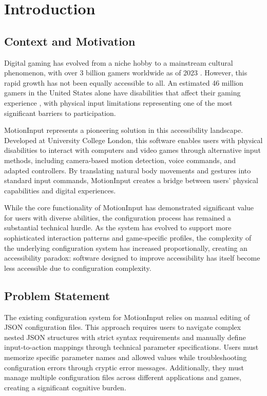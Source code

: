 \chapter{Introduction}

\section{Context and Motivation}
Digital gaming has evolved from a niche hobby to a mainstream cultural phenomenon, with over 3 billion gamers worldwide as of 2023 \cite{newzoo2023}. However, this rapid growth has not been equally accessible to all. An estimated 46 million gamers in the United States alone have disabilities that affect their gaming experience \cite{ablegamers2023}, with physical input limitations representing one of the most significant barriers to participation.

MotionInput represents a pioneering solution in this accessibility landscape. Developed at University College London, this software enables users with physical disabilities to interact with computers and video games through alternative input methods, including camera-based motion detection, voice commands, and adapted controllers. By translating natural body movements and gestures into standard input commands, MotionInput creates a bridge between users' physical capabilities and digital experiences.

While the core functionality of MotionInput has demonstrated significant value for users with diverse abilities, the configuration process has remained a substantial technical hurdle. As the system has evolved to support more sophisticated interaction patterns and game-specific profiles, the complexity of the underlying configuration system has increased proportionally, creating an accessibility paradox: software designed to improve accessibility has itself become less accessible due to configuration complexity.

\section{Problem Statement}
The existing configuration system for MotionInput relies on manual editing of JSON configuration files. This approach requires users to navigate complex nested JSON structures with strict syntax requirements and manually define input-to-action mappings through technical parameter specifications. Users must memorize specific parameter names and allowed values while troubleshooting configuration errors through cryptic error messages. Additionally, they must manage multiple configuration files across different applications and games, creating a significant cognitive burden.

